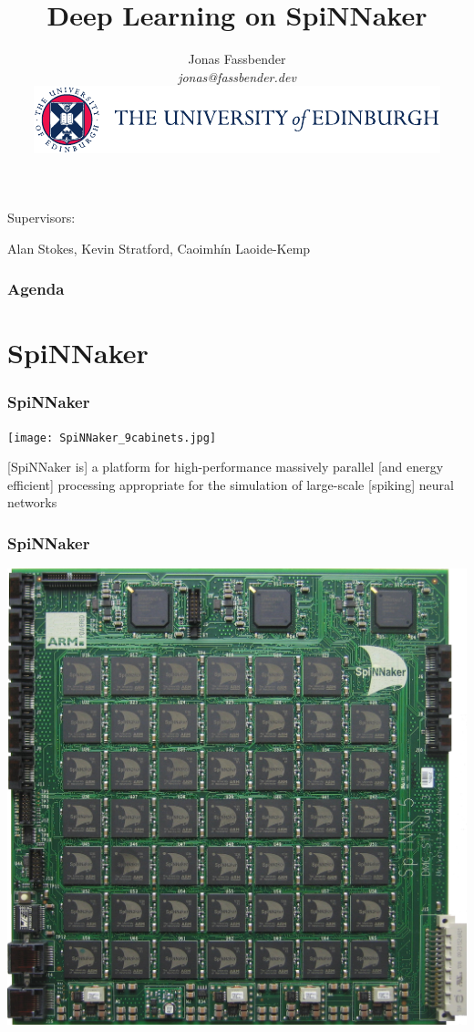 \documentclass[xcolor=x11names,compress,usenames,dvipsnames,mathsans]{beamer}
\title{Deep Learning on SpiNNaker}
\author[author]{Jonas Fassbender \\
\textit{jonas@fassbender.dev} \\
\vspace{1em}
\includegraphics[scale=.8]{logo_colour.pdf}
}
\date{}
\begin{document}
\begin{frame}
  \titlepage
  \vspace{-2cm}

  \begin{center}
  Supervisors:

  Alan Stokes, Kevin Stratford, Caoimhín Laoide-Kemp
  \end{center}
\end{frame}

\begin{frame}[fragile]
  \frametitle{Agenda}
  \tableofcontents
\end{frame}

\section{SpiNNaker}

\begin{frame}[fragile]
  \frametitle{SpiNNaker}

  \begin{center}
    \texttt{[image: SpiNNaker\_9cabinets.jpg]}
  \end{center}

  [SpiNNaker is] a platform for high-performance massively
  parallel [and energy efficient] processing appropriate
  for the simulation of large-scale [spiking] neural
  networks \cite{spinnaker_project}

\end{frame}

\begin{frame}[fragile]
  \frametitle{SpiNNaker}

  \begin{center}
    \includegraphics[width=.7\linewidth]
      {spinnakerBoard.jpg}
  \end{center}
\end{frame}
\end{document}
